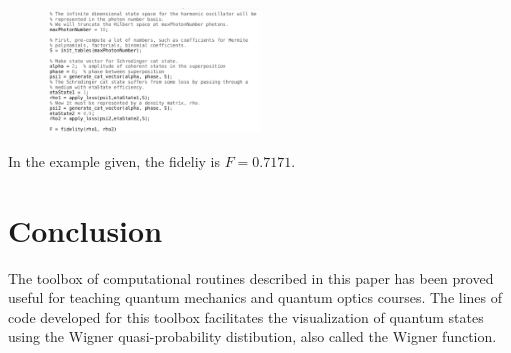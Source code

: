 \documentclass[twocolumn]{rbef}
\begin{document}
\begin{figure}[h!]
\includegraphics[width=0.5\textwidth]{fidelity.eps}
\end{figure}

In the example given, the fideliy is $F = 0.7171$.

\section{Conclusion}
\label{conclusion}
The toolbox of computational routines described in this paper has been proved useful for teaching quantum mechanics and quantum optics courses. The lines of code developed for this toolbox facilitates the visualization of quantum states using the Wigner quasi-probability distibution, also called the Wigner function. 




\end{document}
